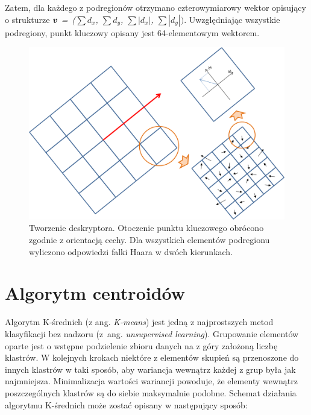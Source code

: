 Zatem, dla każdego z podregionów otrzymano czterowymiarowy wektor opisujący o strukturze \textit{\textbf{v}~=~($\sum$$d_x$, $\sum$$d_y$, $\sum$$|d_x|$, $\sum$$|d_y|)$}. Uwzględniając wszystkie podregiony, punkt kluczowy opisany jest 64-elementowym wektorem. 

 \begin{figure}[h]
	\includegraphics[width=16cm]{Description}
	\centering
	\caption{Tworzenie deskryptora. Otoczenie punktu kluczowego obrócono zgodnie z orientacją cechy. Dla wszystkich elementów podregionu wyliczono odpowiedzi falki Haara w dwóch kierunkach.}
	\label{im: Description}
\end{figure}


\section{Algorytm centroidów}
Algorytm K-średnich (z ang. \textit{K-means}) jest jedną z najprostszych metod klasyfikacji bez nadzoru (z~ang. \textit{unsupervised learning}). Grupowanie elementów oparte jest o wstępne podzielenie zbioru danych na z góry założoną liczbę klastrów. W kolejnych krokach niektóre z elementów skupień są przenoszone do innych klastrów w taki sposób, aby wariancja wewnątrz każdej z grup była jak najmniejsza. Minimalizacja wartości wariancji powoduje, że elementy wewnątrz poszczególnych klastrów są do siebie maksymalnie podobne. Schemat działania algorytmu K-średnich może zostać opisany w następujący sposób:


